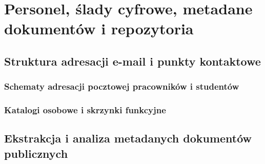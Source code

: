 \chapter{Personel, ślady cyfrowe, metadane dokumentów i repozytoria}\label{ch:personel-slady}


\section{Struktura adresacji e-mail i punkty kontaktowe}\label{sec:struktura-email}

\subsection{Schematy adresacji pocztowej pracowników i studentów}\label{subsec:schematy-email}

\subsection{Katalogi osobowe i skrzynki funkcyjne}\label{subsec:ksiazki-adresowe}

\section{Ekstrakcja i analiza metadanych dokumentów publicznych}\label{sec:metadane-plikow}


